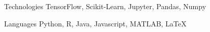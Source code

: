 

\begin{cvskills}

  \cvskill
    {Technologies} %
    {TensorFlow, Scikit-Learn, Jupyter, Pandas, Numpy} %



  \cvskill
    {Languages} %
    {Python, R, Java, Javascript, MATLAB, \LaTeX} %


\end{cvskills}